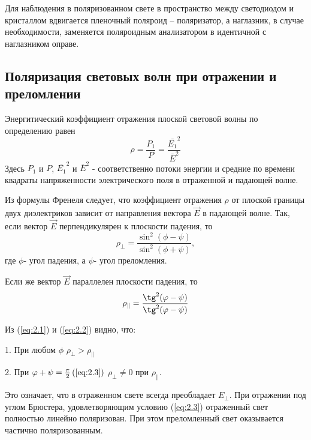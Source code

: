 Для наблюдения в поляризованном свете в пространство меж­ду светодиодом и кристаллом вдвигается пленочный поляроид -- поляризатор, а наглазник, в случае необходимости, заменяется поляроидным анализатором в идентичной с наглазником оправе.


\subsection*{Поляризация световых волн при отражении и преломлении}

Энергитический коэффициент отражения плоской световой волны по определению равен
\begin{equation}
	\rho=\frac{P_1}{P}=\frac{\bar{E_1}^2}{\bar{E}^2}
\end{equation}
Здесь $P_1$ и $P$, $\bar{E_1}^2$ и $\bar{E}^2$ - соответственно потоки энергии и средние по времени квадраты напряженности электрического поля в отраженной и падающей волне.

Из формулы Френеля следует, что коэффициент отражения $\rho$ от плоской границы двух диэлектриков зависит от направления вектора $\vec{E}$ в падающей волне. Так, если вектор $\vec{E}$ перпендикулярен к плоскости падения, то 
\begin{equation}
\label{eq:2.1}
	\rho_{\bot}=\frac{\sin^2(\phi-\psi)}{\sin^2(\phi+\psi)},
\end{equation}
где $\phi$- угол падения, а $\psi$- угол преломления.

Если же вектор $\vec{E}$ параллелен плоскости падения, то
\begin{equation}
\label{eq:2.2}
	\rho_{\|}=\frac{\tg^2(\phi-\psi)}{\tg^2(\phi-\psi)}
\end{equation}

Из (\ref{eq:2.1}) и (\ref{eq:2.2}) видно, что:

1. При любом $\phi$ $\rho_{\bot}>\rho_{\|}$

2. При $\phi+\psi=\frac{\pi}{2} \label{eq:2.3} \, (\ref{eq:2.3})$
$\rho_{\bot}\neq0$ при $\rho_{\|}$.

Это означает, что в  отраженном свете всегда преобладает $E_{\bot}$.
При отражении под углом Брюстера, удовлетворяющим условию (\ref{eq:2.3})
отраженный свет полностью линейно поляризован. При этом преломленный свет оказывается частично поляризованным.

